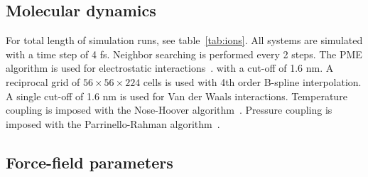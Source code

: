 \documentclass[journal=langd5,manuscript=article]{achemso}
\begin{document}
\subsection{Molecular dynamics}
For total length of simulation runs, see table~\ref{tab:ions}.
All systems are simulated with a time step of 4 fs.
Neighbor searching is performed every 2 steps.
The PME algorithm is used for electrostatic interactions~\cite{essmann:1995}.
with a cut-off of 1.6 nm.
A reciprocal grid of $56 \times 56 \times 224$ cells is used with 4th order B-spline interpolation.
A single cut-off of 1.6 nm is used for Van der Waals interactions.
Temperature coupling is imposed with the Nose-Hoover algorithm~\cite{nose:1983}.
Pressure coupling is imposed with the Parrinello-Rahman algorithm~\cite{parrinello:1981}.

\subsection{Force-field parameters}
\end{document}
